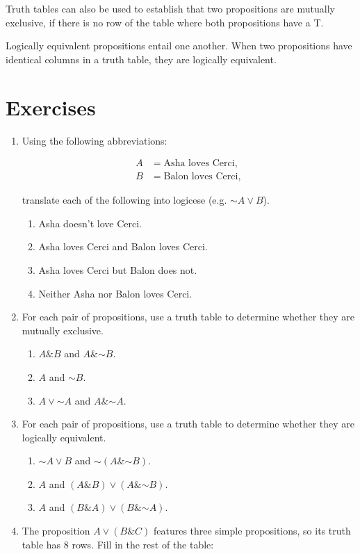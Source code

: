 \documentclass[justified]{tufte-book}
\providecommand{\tightlist}{%
  \setlength{\itemsep}{0pt}\setlength{\parskip}{0pt}}
\renewcommand{\neg}{\mathbin{\sim}}
\renewcommand{\wedge}{\mathbin{\&}}
\begin{document}
Truth tables can also be used to establish that two propositions are mutually exclusive, if there is no row of the table where both propositions have a T.

Logically equivalent propositions entail one another. When two propositions have identical columns in a truth table, they are logically equivalent.

\hypertarget{exercises-2}{%
\section*{Exercises}\label{exercises-2}}

\begin{enumerate}
\item
  Using the following abbreviations:

  \[
    \begin{aligned}
       A &= \mbox{Asha loves Cerci},\\
       B &= \mbox{Balon loves Cerci},
    \end{aligned}
  \]

  translate each of the following into logicese (e.g. \(\neg A \vee B\)).

  \begin{enumerate}
  \def\labelenumii{\alph{enumii}.}
  \tightlist
  \item
    Asha doesn't love Cerci.
  \item
    Asha loves Cerci and Balon loves Cerci.
  \item
    Asha loves Cerci but Balon does not.
  \item
    Neither Asha nor Balon loves Cerci.
  \end{enumerate}
\item
  For each pair of propositions, use a truth table to determine whether they are mutually exclusive.

  \begin{enumerate}
  \def\labelenumii{\alph{enumii}.}
  \tightlist
  \item
    \(A \wedge B\) and \(A \wedge \neg B\).
  \item
    \(A\) and \(\neg B\).
  \item
    \(A \vee \neg A\) and \(A \wedge \neg A\).
  \end{enumerate}
\item
  For each pair of propositions, use a truth table to determine whether they are logically equivalent.

  \begin{enumerate}
  \def\labelenumii{\alph{enumii}.}
  \tightlist
  \item
    \(\neg A \vee B\) and \(\neg (A \wedge \neg B)\).
  \item
    \(A\) and \((A \wedge B) \vee (A \wedge \neg B)\).
  \item
    \(A\) and \((B \wedge A) \vee (B \wedge \neg A)\).
  \end{enumerate}
\item
  The proposition \(A \vee (B \wedge C)\) features three simple propositions, so its truth table has 8 rows. Fill in the rest of the table:


\end{enumerate}
\end{document}
